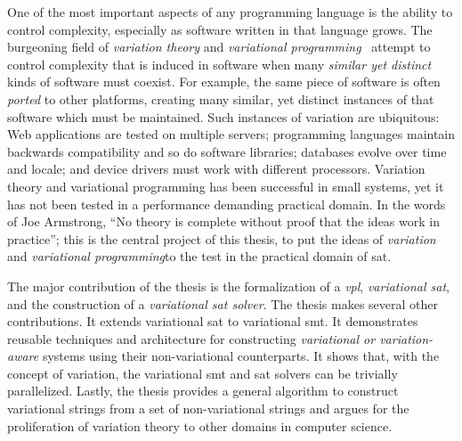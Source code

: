 One of the most important aspects of any programming language is the ability to
control complexity, especially as software written in that language grows. The
burgeoning field of \emph{variation theory} and \emph{variational
  programming}~\cite{EW11gttse,EW11tosem,HW16fosd,CEW16ecoop,Walk14onward}
attempt to control complexity that is induced in software when many
\emph{similar yet distinct} kinds of software must coexist. For example, the
same piece of software is often \emph{ported} to other platforms, creating many
similar, yet distinct instances of that software which must be maintained. Such
instances of variation are ubiquitous: Web applications are tested on multiple
servers; programming languages maintain backwards compatibility and so do
software libraries; databases evolve over time and locale; and device drivers
must work with different processors. Variation theory and variational
programming has been successful in small systems, yet it has not been tested in
a performance demanding practical domain. In the words of Joe
Armstrong\cite{armstrongThesis}, ``No theory is complete without proof that the
ideas work in practice''; this is the central project of this thesis, to put the
ideas of \emph{variation} and \emph{variational programming}to the test in the
practical domain of \ac{sat}.

The major contribution of the thesis is the formalization of a \emph{\ac{vpl}},
\emph{variational \acl{sat}}, and the construction of a \emph{variational
  \ac{sat} solver}. The thesis makes several other contributions. It extends
variational \acl{sat} to variational \acl{smt}. It demonstrates reusable
techniques and architecture for constructing \emph{variational or
  variation-aware} systems using their non-variational counterparts. It shows
that, with the concept of variation, the variational \ac{smt} and \ac{sat}
solvers can be trivially parallelized. Lastly, the thesis provides a general
algorithm to construct variational strings from a set of non-variational strings
and argues for the proliferation of variation theory to other domains in
computer science.

